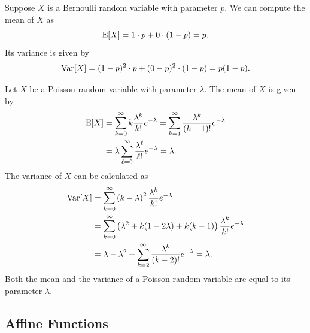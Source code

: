 \begin{example}
Suppose $X$ is a Bernoulli random variable with parameter $p$.
We can compute the mean of $X$ as
\begin{equation*}
\mathrm{E} [X] = 1 \cdot p + 0 \cdot (1 - p) = p .
\end{equation*}
Its variance is given by
\begin{equation*}
\mathrm{Var} [X] = (1 - p)^2 \cdot p + (0 - p)^2 \cdot (1 - p)
= p (1 - p) .
\end{equation*}
\end{example}

\begin{example} \label{example:PoissonMeanVariance}
Let $X$ be a Poisson random variable with parameter $\lambda$.
The mean of $X$ is given by
\begin{equation*}
\begin{split}
\mathrm{E} [X] &= \sum_{k=0}^{\infty} k \frac{\lambda^k}{k!} e^{- \lambda}
= \sum_{k=1}^{\infty} \frac{\lambda^k}{(k-1)!} e^{- \lambda} \\
&= \lambda \sum_{\ell=0}^{\infty} \frac{\lambda^\ell}{\ell!} e^{- \lambda}
= \lambda .
\end{split}
\end{equation*}
The variance of $X$ can be calculated as
\begin{equation*}
\begin{split}
\mathrm{Var} [X] &= \sum_{k=0}^{\infty} \left( k - \lambda \right)^2
\frac{\lambda^k}{k!} e^{- \lambda} \\
&= \sum_{k=0}^{\infty} \left(\lambda^2 + k (1 - 2 \lambda) + k(k-1) \right)
\frac{\lambda^k}{k!} e^{- \lambda} \\
&= \lambda - \lambda^2
+ \sum_{k=2}^{\infty} \frac{\lambda^k}{(k-2)!} e^{- \lambda}
= \lambda .
\end{split}
\end{equation*}
Both the mean and the variance of a Poisson random variable are equal to its parameter $\lambda$.
\end{example}


\subsection{Affine Functions}

